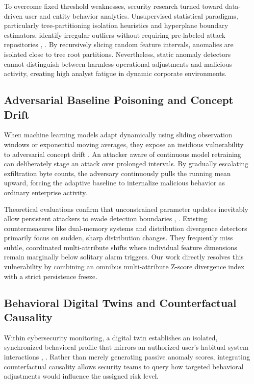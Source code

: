 \documentclass[conference]{IEEEtran}
\begin{document}
To overcome fixed threshold weaknesses, security research turned toward data-driven user and entity behavior analytics. Unsupervised statistical paradigms, particularly tree-partitioning isolation heuristics and hyperplane boundary estimators, identify irregular outliers without requiring pre-labeled attack repositories \cite{b6}, \cite{b7}. By recursively slicing random feature intervals, anomalies are isolated close to tree root partitions. Nevertheless, static anomaly detectors cannot distinguish between harmless operational adjustments and malicious activity, creating high analyst fatigue in dynamic corporate environments.

\subsection{Adversarial Baseline Poisoning and Concept Drift}
When machine learning models adapt dynamically using sliding observation windows or exponential moving averages, they expose an insidious vulnerability to adversarial concept drift \cite{b5}. An attacker aware of continuous model retraining can deliberately stage an attack over prolonged intervals. By gradually escalating exfiltration byte counts, the adversary continuously pulls the running mean upward, forcing the adaptive baseline to internalize malicious behavior as ordinary enterprise activity.

Theoretical evaluations confirm that unconstrained parameter updates inevitably allow persistent attackers to evade detection boundaries \cite{b5}, \cite{b8}. Existing countermeasures like dual-memory systems and distribution divergence detectors primarily focus on sudden, sharp distribution changes. They frequently miss subtle, coordinated multi-attribute shifts where individual feature dimensions remain marginally below solitary alarm triggers. Our work directly resolves this vulnerability by combining an omnibus multi-attribute Z-score divergence index with a strict persistence freeze.

\subsection{Behavioral Digital Twins and Counterfactual Causality}
Within cybersecurity monitoring, a digital twin establishes an isolated, synchronized behavioral profile that mirrors an authorized user's habitual system interactions \cite{b1}, \cite{b10}. Rather than merely generating passive anomaly scores, integrating counterfactual causality allows security teams to query how targeted behavioral adjustments would influence the assigned risk level.
\end{document}

